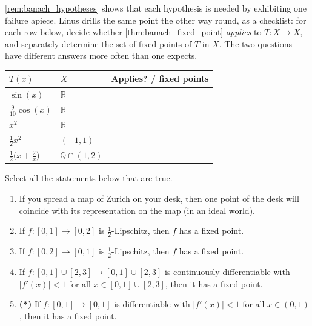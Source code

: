 \begin{exercise}
\label{ex:bfpt_applicability_table}
\cref{rem:banach_hypotheses} shows that each hypothesis is needed by exhibiting one failure
apiece. Linus drills the same point the other way round, as a checklist: for each row below,
decide whether \cref{thm:banach_fixed_point} \emph{applies} to $T : X \to X$, and separately
determine the set of fixed points of $T$ in $X$. The two questions have different answers more
often than one expects.
\begin{center}
\begin{tabular}{lll}
\textbf{$T(x)$} & \textbf{$X$} & \textbf{Applies? / fixed points} \\
\hline
$\sin(x)$ & $\mathbb{R}$ & \\
$\tfrac{9}{10}\cos(x)$ & $\mathbb{R}$ & \\
$x^2$ & $\mathbb{R}$ & \\
$\tfrac12x^2$ & $(-1,1)$ & \\
$\tfrac12\big(x + \tfrac2x\big)$ & $\mathbb{Q}\cap(1,2)$ &
\end{tabular}
\end{center}
\end{exercise}




\begin{exercise}
\label{ex:fixed_points_multiple_choice}
Select all the statements below that are true.
\begin{enumerate}[label=\textbf{(\alph*)}]
  \item If you spread a map of Zurich on your desk, then one point of the desk will coincide with
    its representation on the map (in an ideal world).
  \item If $f : [0,1] \to [0,2]$ is $\tfrac{1}{2}$-Lipschitz, then $f$ has a fixed point.
  \item If $f : [0,2] \to [0,1]$ is $\tfrac{1}{2}$-Lipschitz, then $f$ has a fixed point.
  \item If $f : [0,1] \cup [2,3] \to [0,1] \cup [2,3]$ is continuously differentiable with
    $|f'(x)| < 1$ for all $x \in [0,1]\cup[2,3]$, then it has a fixed point.
  \item \textbf{(*)} If $f : [0,1] \to [0,1]$ is differentiable with $|f'(x)| < 1$ for all
    $x \in (0,1)$, then it has a fixed point.
\end{enumerate}
\end{exercise}


